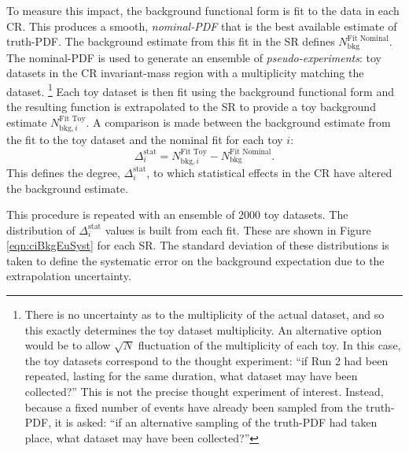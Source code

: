 To measure this impact, the background functional form is fit to the data in each CR.
This produces a smooth, \emph{nominal-PDF} that is the best available estimate of truth-PDF.
The background estimate from this fit in the SR defines $N_\text{bkg}^\text{Fit Nominal}$.
The nominal-PDF is used to generate an ensemble of \emph{pseudo-experiments}: toy datasets in the CR invariant-mass region with a multiplicity matching the dataset.
\footnote{There is no uncertainty as to the multiplicity of the actual dataset, and so this exactly determines the toy dataset multiplicity. An alternative option would be to allow $\sqrt{N}$ fluctuation of the multiplicity of each toy. In this case, the toy datasets correspond to the thought experiment: ``if Run 2 had been repeated, lasting for the same duration, what dataset may have been collected?'' This is not the precise thought experiment of interest. Instead, because a fixed number of events have already been sampled from the truth-PDF, it is asked: ``if an alternative sampling of the truth-PDF had taken place, what dataset may have been collected?''}
Each toy dataset is then fit using the background functional form and the resulting function is extrapolated to the SR to provide a toy background estimate $N_{\text{bkg},i}^\text{Fit Toy}$.
A comparison is made between the background estimate from the fit to the toy dataset and the nominal fit for each toy $i$:
\begin{equation*}
    \Delta_i^\text{stat}=N_{\text{bkg},i}^\text{Fit Toy}-N_\text{bkg}^\text{Fit Nominal}.
\end{equation*}
This defines the degree, $\Delta_i^\text{stat}$, to which statistical effects in the CR have altered the background estimate.


This procedure is repeated with an ensemble of 2000 toy datasets.
The distribution of $\Delta_i^\text{stat}$ values is built from each fit. These are shown in Figure \ref{eqn:ciBkgEuSyst} for each SR.
The standard deviation of these distributions is taken to define the systematic error on the background expectation due to the extrapolation uncertainty.

